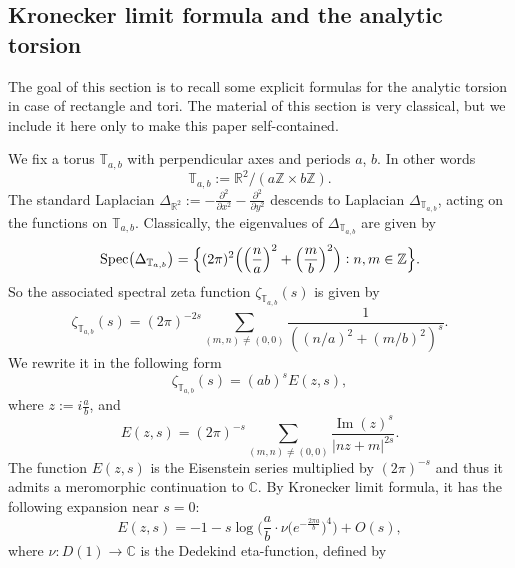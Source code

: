 \documentclass[12pt]{article}
\numberwithin{equation}{section}
\theoremstyle{theorem}
\theoremstyle{definition}
\theoremstyle{remark}
\newcommand{\comp}{\mathbb{C}}
\newcommand{\real}{\mathbb{R}}
\newcommand{\integ}{\mathbb{Z}}
\newcommand{\spec}{{\rm{Spec}}}
\renewcommand{\Im}{\operatorname{Im}}
\begin{document}
\subsection{Kronecker limit formula and the analytic torsion}\label{sect_kron}
	The goal of this section is to recall some explicit formulas for the analytic torsion in case of rectangle and tori.
	The material of this section is very classical, but we include it here only to make this paper self-contained.
	\par We fix a torus $\mathbb{T}_{a,b}$ with perpendicular axes and periods $a$, $b$. In other words
	\begin{equation}
		\mathbb{T}_{a,b} := \real^2 / (a \integ \times b \integ).
	\end{equation}
	The standard Laplacian $\Delta_{\real^2} := - \frac{\partial^2}{\partial x^2} - \frac{\partial^2}{\partial y^2}$  descends to Laplacian $\Delta_{\mathbb{T}_{a,b}}$, acting on the functions on $\mathbb{T}_{a,b}$.
	Classically, the eigenvalues of  $\Delta_{\mathbb{T}_{a,b}}$ are given by
	\begin{equation}
		\spec \big( \Delta_{\mathbb{T}_{a,b}} \big) 
		=
		\Big \{
			(2 \pi)^2 \Big(
				\Big( \frac{n}{a} \Big)^2 + \Big( \frac{m}{b} \Big)^2
			\Big)
			:
			n, m \in \integ
		\Big \}.
	\end{equation}
	So the associated spectral zeta function $\zeta_{\mathbb{T}_{a,b}}(s)$ is given by
	\begin{equation}
		\zeta_{\mathbb{T}_{a,b}}(s) 
		= 
		(2 \pi)^{-2s}
		\sum_{(m, n) \neq (0, 0)}
		\frac{1}{((n/a)^2 + (m/b)^2)^s}.
	\end{equation}
	We rewrite it in the following form
	\begin{equation}\label{eq_zeta_tor_eis}
		\zeta_{\mathbb{T}_{a,b}}(s) 
		= 
		(ab)^s E(z, s),
	\end{equation}
	where $z := i \frac{a}{b}$, and 
	\begin{equation}
		E(z, s) = (2 \pi)^{-s} \sum_{(m, n) \neq (0, 0)}
		\frac{\Im(z)^s}{|nz + m|^{2s}}.
	\end{equation}
	The function $E(z, s)$ is the Eisenstein series multiplied by $(2 \pi)^{-s}$ and thus it admits a meromorphic continuation to $\comp$. 
	By Kronecker limit formula, it has the following expansion near $s = 0$:
	\begin{equation}\label{eq_kron_lim_f}
		E(z, s) = - 1 - s \log \Big(  \frac{a}{b}  \cdot \nu \big( e^{- \frac{2 \pi a}{b}} \big)^4 \Big) + O(s),
	\end{equation}
	where $\nu : D(1) \to \comp$ is the Dedekind eta-function, defined by 
\end{document}

